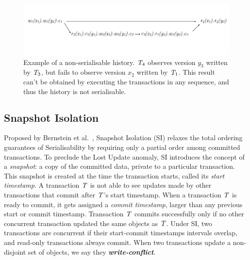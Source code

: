 \begin{figure}[h]
  \centering
  \vspace{-1cm}
  \includegraphics[width=\textwidth]{figures/non_ser_hist.pdf}
  \vspace{-1cm}
  \caption{Example of a non-serialisable history. $\mathit{T}_4$ observes version $y_3$ written by $\mathit{T}_3$, but fails to observe version $x_2$ written by $\mathit{T}_1$. This result can't be obtained by executing the transactions in any sequence, and thus the history is not serialisable.}
  \label{fig:non_ser_history}
\end{figure}


\subsection{Snapshot Isolation}

Proposed by Bernstein et al.~\citep{sql-critique}, Snapshot Isolation (SI) relaxes the total ordering guarantees of Serialisability by requiring only a partial order among committed transactions. To preclude the Lost Update anomaly, SI introduces the concept of a \emph{snapshot}: a copy of the committed data, private to a particular transaction. This snapshot is created at the time the transaction starts, called its \emph{start timestamp}. A transaction $\mathit{T}$ is not able to see updates made by other transactions that commit after $\mathit{T}$'s start timestamp. When a transaction $\mathit{T}$ is ready to commit, it gets assigned a \emph{commit timestamp}, larger than any previous start or commit timestamp. Transaction $\mathit{T}$ commits successfully only if no other concurrent transaction updated the same objects as $\mathit{T}$. Under SI, two transactions are concurrent if their start-commit timestamps intervals overlap, and read-only transactions always commit. When two transactions update a non-disjoint set of objects, we say they \textbf{\em write-conflict}.

